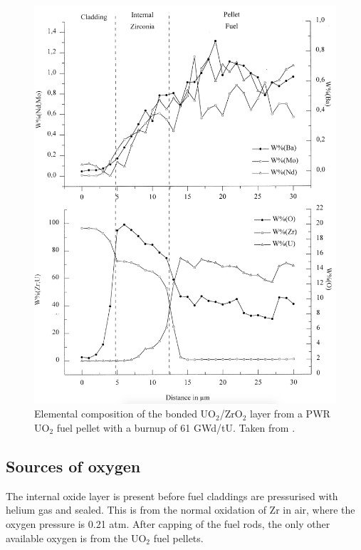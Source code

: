 \begin{figure}[ht!]
\centering
\includegraphics[width=14cm]{images/bonding_layer_composition.png}
\caption[Elemental composition of the bonded UO$_{2}$/ZrO$_{2}$ layer from a PWR UO$_{2}$ fuel pellet with a burnup of 61 GWd/tU.]{Elemental composition of the bonded UO$_{2}$/ZrO$_{2}$ layer from a PWR UO$_{2}$ fuel pellet with a burnup of 61 GWd/tU. Taken from \cite{Lozano1998}.}
\label{figure:bonding_layer_composition}
\end{figure}


\subsection{Sources of oxygen}

The internal oxide layer is present before fuel claddings are pressurised with helium gas and sealed. This is from the normal oxidation of Zr in air, where the oxygen pressure is 0.21 atm. After capping of the fuel rods, the only other available oxygen is from the UO$_{2}$ fuel pellets.

